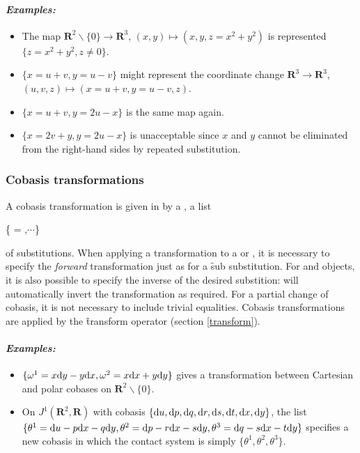 \paragraph{\textit{Examples:}}
\begin{itemize}
\item The map ${\mathbf{R}}^2\backslash\{0\}\to{\mathbf{R}}^3$, $(x,y)\mapsto (x,y,z=x^2+y^2)$
      is represented $\{z = x^2+y^2,z\neq 0\}$.
\item $\{x=u+v,y=u-v\}$ might represent the coordinate change
      ${\mathbf{R}}^3\to{\mathbf{R}}^3$, $(u,v,z)\mapsto(x=u+v,y=u-v,z)$.
\item $\{x=u+v,y=2u-x\}$ is the same map again.
\item $\{x=2v+y,y=2u-x\}$ is unacceptable since $x$ and $y$ cannot be
      eliminated from the right-hand sides by repeated substitution.
\end{itemize}

\subsubsection{Cobasis transformations}
\label{Cobasis transformations}

A cobasis transformation is given in  by a , a list
\begin{syntax}
	\{ = ,$\cdots$\}
\end{syntax}
of substitutions. When applying a transformation to a  or
, it is necessary to specify the \emph{forward}
transformation just as for a \f{sub} substitution. For  and
 objects, it is also possible to specify the inverse of
the desired substition:  will automatically invert the transformation
as required. For a partial change of cobasis, it is not necessary to
include trivial equalities. Cobasis transformations are applied by the
\f{transform} operator (section \ref{transform}).

\paragraph{\textit{Examples:}}
\begin{itemize}
\item $\{\omega^1 = x\mathrm{d} y - y\mathrm{d} x, \omega^2 = x\mathrm{d} x + y\mathrm{d} y\}$ gives a
transformation between Cartesian and polar cobases on
${\mathbf{R}}^2\backslash\{0\}$.
\item On $J^1({\mathbf{R}}^2,{\mathbf{R}})$ with cobasis $\{\mathrm{d} u,\mathrm{d} p,\mathrm{d} q,\mathrm{d} r,\mathrm{d} s,\mathrm{d} t,\mathrm{d}
x,\mathrm{d} y\}$, the list $\{\theta^1=\mathrm{d} u - p\mathrm{d} x - q\mathrm{d} y, \theta^2=\mathrm{d} p -
r\mathrm{d} x - s\mathrm{d} y, \theta^3=\mathrm{d} q - s\mathrm{d} x - t\mathrm{d} y\}$ specifies a new cobasis in
which the contact system is simply $\{\theta^1,\theta^2,\theta^3\}$.
\end{itemize}

